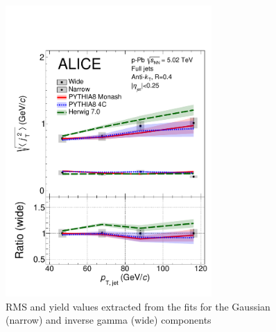 



\begin{figure}[t]
  \begin{center}
  \includegraphics[width=0.7\textwidth]{newfigures/RMSWithSystematics_Pythia.pdf}
  \caption{RMS and yield values extracted from the fits for the Gaussian (narrow) and inverse gamma (wide) components}
  \label{fig:rms_models}
  \end{center}
  \end{figure}

